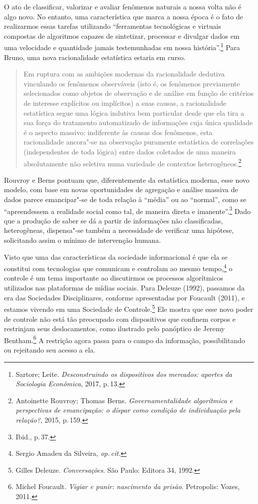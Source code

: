 O ato de classificar, valorizar e avaliar fenômenos naturais a nossa
volta não é algo novo. No entanto, uma característica que marca a nossa
época é o fato de realizarmos essas tarefas utilizando ``ferramentas
tecnológicas e virtuais compostas de algoritmos capazes de sintetizar,
processar e divulgar dados em uma velocidade e quantidade jamais
testemunhadas em nossa história''.\footnote{Sartore; Leite. \emph{Desconstruindo os
dispositivos dos mercados: aportes da Sociologia Econômica}, 2017, p.\,13.} Para Bruno, uma nova racionalidade estatística estaria em curso.

\begin{quote}
Em ruptura com as ambições modernas da racionalidade dedutiva vinculando
os fenômenos observáveis (isto é, os fenômenos previamente selecionados
como objetos de observação e de análise em função de critérios de
interesse explícitos ou implícitos) a suas causas, a racionalidade
estatística segue uma lógica indutiva bem particular desde que ela tira
a sua força do tratamento automatizado de informações cuja única
qualidade é o aspecto massivo: indiferente às causas dos fenômenos, esta
racionalidade ancora"-se na observação puramente estatística de
correlações (independentes de toda lógica) entre dados coletados de uma
maneira absolutamente não seletiva numa variedade de contextos
heterogêneos.\footnote{Antoinette Rouvroy; Thomas Berns. \emph{Governamentalidade
algorítmica e perspectivas de emancipação: o díspar como condição de
individuação pela relação?}, 2015, p.\,159.}
\end{quote}

Rouvroy e Berns pontuam que, diferentemente da estatística
moderna, esse novo modelo, com base em novas oportunidades de agregação
e análise massiva de dados parece emancipar"-se de toda relação à
``média'' ou ao ``normal'', como se ``apreendessem a realidade social
como tal, de maneira direta e imanente''.\footnote{Ibid., p.\,37.} Dado que a produção
de saber se dá a partir de informações não classificadas, heterogêneas,
dispensa"-se também a necessidade de verificar uma hipótese, solicitando
assim o mínimo de intervenção humana.

Visto que uma das características da sociedade informacional é que ela
se constitui com tecnologias que comunicam e controlam ao mesmo tempo,\footnote{Sergio Amadeu da Silveira, \textit{op.\,cit.}}
o controle é um tema importante ao discutirmos os
processos algorítmicos utilizados nas plataformas de mídias sociais.
Para Deleuze (1992), passamos da era das Sociedades Disciplinares,
conforme apresentadas por Foucault (2011), e estamos vivendo em uma Sociedade de Controle.\footnote{Gilles Deleuze. \emph{Conversações}. São Paulo: Editora 34, 1992.} Ele mostra que esse novo poder de controle não está tão
preocupado com dispositivos que confinem corpos e restrinjam seus
deslocamentos, como ilustrado pelo panóptico de Jeremy Bentham.\footnote{Michel Foucault. \emph{Vigiar e punir: nascimento da prisão}. Petropolis: Vozes, 2011.}
A restrição agora passa para o campo da informação, possibilitando ou rejeitando seu acesso a ela.


